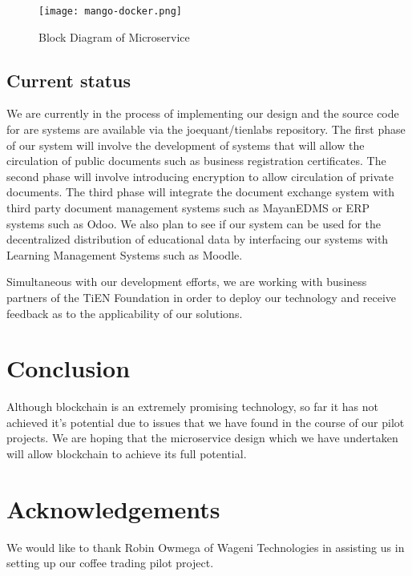 \documentclass[journal]{IEEEtran}
\begin{document}
\begin{comment}
@startuml

package "Docker Image" {
  [GraphJS API]
  [Git Repository]
  [Mango Interface]
}

cloud {
  [Ethereum Blockchain]
}

cloud {
  [IPFS Data Store]
}

[Document] --> [GraphJS API]
[GraphJS API] --> [Git Repository]
[Git Repository] --> [Mango Interface]
[Mango Interface] --> [Ethereum Blockchain]
[Mango Interface] --> [IPFS Data Store]

@enduml
\end{comment}
\begin{figure}
  \texttt{[image: mango-docker.png]}
  \caption{Block Diagram of Microservice}
\end{figure}

\subsection{Current status}

We are currently in the process of implementing our design and the
source code for are systems are available via the joequant/tienlabs
repository.  The first phase of our system will involve the
development of systems that will allow the circulation of public
documents such as business registration certificates.  The second
phase will involve introducing encryption to allow circulation of
private documents.  The third phase will integrate the document
exchange system with third party document management systems such as
MayanEDMS or ERP systems such as Odoo.  We also plan to see if our
system can be used for the decentralized distribution of educational
data by interfacing our systems with Learning Management Systems such
as Moodle.

Simultaneous with our development efforts, we are working with
business partners of the TiEN Foundation in order to deploy our
technology and receive feedback as to the applicability of our
solutions.

\section{Conclusion}
Although blockchain is an extremely promising technology, so far it
has not achieved it's potential due to issues that we have found in
the course of our pilot projects.  We are hoping that the microservice
design which we have undertaken will allow blockchain to achieve its
full potential.

\section{Acknowledgements}
We would like to thank Robin Owmega of Wageni Technologies in
assisting us in setting up our coffee trading pilot project.



\end{document}
